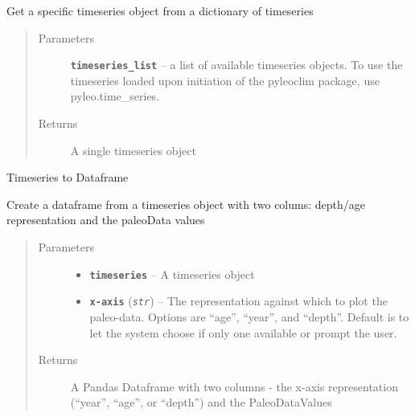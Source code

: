 \documentclass[letterpaper,10pt,english]{sphinxmanual}
\begin{document}
\begin{fulllineitems}
\label{LIPDutils:pyleoclim.getTs}
Get a specific timeseries object from a dictionary of timeseries
\begin{quote}\begin{description}
\item[{Parameters}] \leavevmode
\textbf{\texttt{timeseries\_list}} -- a  list of available timeseries objects.
To use the timeseries loaded upon initiation of the
pyleoclim package, use pyleo.time\_series.

\item[{Returns}] \leavevmode
A single timeseries object

\end{description}\end{quote}

\end{fulllineitems}


\begin{fulllineitems}
\label{LIPDutils:pyleoclim.TsToDf}
Timeseries to Dataframe

Create a dataframe from a timeseries object with two colums:
depth/age representation and the paleoData values
\begin{quote}\begin{description}
\item[{Parameters}] \leavevmode\begin{itemize}
\item {} 
\textbf{\texttt{timeseries}} -- A timeseries object

\item {} 
\textbf{\texttt{x-axis}} (\emph{\texttt{str}}) -- The representation against which to plot the paleo-data.
Options are ``age'', ``year'', and ``depth''. Default is to let the
system choose if only one available or prompt the user.

\end{itemize}

\item[{Returns}] \leavevmode
A Pandas Dataframe with two columns - the x-axis representation
(``year'', ``age'', or ``depth'') and the PaleoDataValues

\end{description}\end{quote}

\end{fulllineitems}
\end{document}
